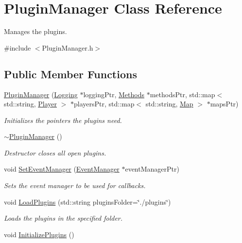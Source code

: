 \hypertarget{classPluginManager}{\section{Plugin\-Manager Class Reference}
\label{classPluginManager}
}


Manages the plugins.  




{\ttfamily \#include $<$Plugin\-Manager.\-h$>$}

\subsection*{Public Member Functions}
\begin{DoxyCompactItemize}
\item 
\hyperlink{classPluginManager_a206d856a7ded8cebce7421d09c1da20d}{Plugin\-Manager} (\hyperlink{classLogging}{Logging} $\ast$logging\-Ptr, \hyperlink{classMethods}{Methods} $\ast$methods\-Ptr, std\-::map$<$ std\-::string, \hyperlink{structPlayer}{Player} $>$ $\ast$players\-Ptr, std\-::map$<$ std\-::string, \hyperlink{structMap}{Map} $>$ $\ast$maps\-Ptr)
\begin{DoxyCompactList}\small\item\em Initializes the pointers the plugins need. \end{DoxyCompactList}\item 
\hypertarget{classPluginManager_ab657302ef5af357907ae11ad817f5dfc}{\hyperlink{classPluginManager_ab657302ef5af357907ae11ad817f5dfc}{$\sim$\-Plugin\-Manager} ()}\label{classPluginManager_ab657302ef5af357907ae11ad817f5dfc}

\begin{DoxyCompactList}\small\item\em Destructor closes all open plugins. \end{DoxyCompactList}\item 
void \hyperlink{classPluginManager_a7ed7485291babeed3109a1a364b6d308}{Set\-Event\-Manager} (\hyperlink{classEventManager}{Event\-Manager} $\ast$event\-Manager\-Ptr)
\begin{DoxyCompactList}\small\item\em Sets the event manager to be used for callbacks. \end{DoxyCompactList}\item 
void \hyperlink{classPluginManager_a0ff203ba125f85688fa752bf789418f0}{Load\-Plugins} (std\-::string plugins\-Folder=\char`\"{}./plugins\char`\"{})
\begin{DoxyCompactList}\small\item\em Loads the plugins in the specified folder. \end{DoxyCompactList}\item 
\hypertarget{classPluginManager_aba7e19d75b25ca1a91b92d95b173240f}{void \hyperlink{classPluginManager_aba7e19d75b25ca1a91b92d95b173240f}{Initialize\-Plugins} ()}\label{classPluginManager_aba7e19d75b25ca1a91b92d95b173240f}


\end{DoxyCompactItemize}
